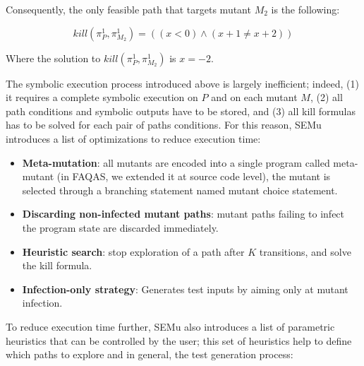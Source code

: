 Consequently, the only feasible path that targets mutant $M_2$ is the following:

\begin{equation}
	kill(\pi_{P}^{1}, \pi_{M_2}^{1}) = ((x < 0) \wedge (x + 1 \neq x + 2) )
\end{equation}

Where the solution to $kill(\pi_{P}^{1}, \pi_{M_2}^{1})$ is $x = -2$.

The symbolic execution process introduced above is largely inefficient; indeed,
(1) it requires a complete symbolic execution on $P$ and on each mutant $M$, (2) all path conditions and symbolic outputs have to be stored, and (3) all kill formulas has to be solved for each pair of paths conditions. 
For this reason, SEMu introduces a list of optimizations to reduce execution time:

\begin{itemize}
	\item \textbf{Meta-mutation}: all mutants are encoded into a single program called meta-mutant (in FAQAS, we extended it at source code level), the mutant is selected through a branching statement named mutant choice statement.
	\item \textbf{Discarding non-infected mutant paths}: mutant paths failing to infect the program state are discarded immediately.
	\item \textbf{Heuristic search}: stop exploration of a path after $K$ transitions, and solve the kill formula.
	\item \textbf{Infection-only strategy}: Generates test inputs by aiming only at mutant infection.
\end{itemize}


To reduce execution time further, SEMu also introduces a list of parametric heuristics that can be controlled by the user; this set of heuristics help to define which paths to explore and in general, the test generation process:


